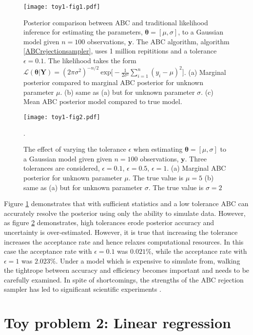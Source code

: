 \begin{figure}[H]
	\centering
	\texttt{[image: toy1-fig1.pdf]}
	\caption{Posterior comparison between ABC and traditional likelihood inference for estimating the parameters, $\bm{\theta} = [\mu,\sigma]$, to a Gaussian model given $n = 100$ observations, $\bm{y}$. The ABC algorithm, algorithm \ref{ABCrejectionsampler}, uses 1 million repititions and a tolerance $\epsilon = 0.1$. The likelihood takes the form $\mathcal{L}(\bm{\theta}|\bm{Y}) = (2\pi\sigma^2)^{-n/2}\ \text{exp}\big[-\frac{1}{2\sigma^2}\sum_{i = 1}^{n}(y_i-\mu)^2\big]$. (a) Marginal posterior compared to marginal ABC posterior for unknown parameter $\mu$. (b) same as (a) but for unknown parameter $\sigma$. (c) Mean ABC posterior model compared to true model.}
	\label{toy1-fig1}
\end{figure}

\begin{figure}[H]
	\centering
	\texttt{[image: toy1-fig2.pdf]}
	\caption{The effect of varying the tolerance $\epsilon$ when estimating $\bm{\theta} = [\mu,\sigma]$ to a Gaussian model given given $n = 100$ observations, $\bm{y}$. Three tolerances are considered, $\epsilon = 0.1$, $\epsilon = 0.5$, $\epsilon = 1$. (a) Marginal ABC posterior for unknown parameter $\mu$. The true value is $\mu = 5$ (b) same as (a) but for unknown parameter $\sigma$. The true value is $\sigma = 2$}.
	\label{toy1-fig2}
\end{figure}

Figure \ref{toy1-fig1} demonstrates that with sufficient statistics and a low tolerance ABC can accurately resolve the posterior using only the ability to simulate data. However, as figure \ref{toy1-fig2} demonstrates, high tolerances erode posterior accuracy and uncertainty is over-estimated. However, it is true that increasing the tolerance increases the acceptance rate and hence relaxes computational resources. In this case the acceptance rate with $\epsilon = 0.1$ was $0.021\%$, while the acceptance rate with $\epsilon = 1$ was $2.023\%$. Under a model which is expensive to simulate from, walking the tightrope between accuracy and efficiency becomes important and needs to be carefully examined. In spite of shortcomings, the strengths of the ABC rejection sampler has led to significant scientific experiments \citep{Fu1997,Weiss1998a,Pritchard1999a}.

\section{Toy problem 2: Linear regression}
\label{sec-lin-reg}

